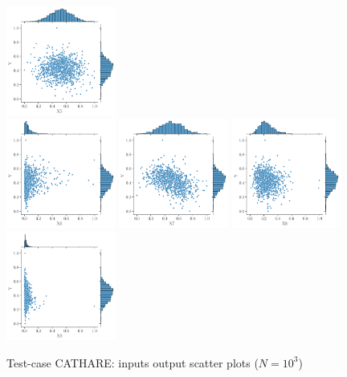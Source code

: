 \begin{figure}
    \includegraphics[width=0.32\textwidth]{./part2/figures/SIS/cathare_jointplot_X5.pdf}\\
    \includegraphics[width=0.32\textwidth]{./part2/figures/SIS/cathare_jointplot_X6.pdf}
    \includegraphics[width=0.32\textwidth]{./part2/figures/SIS/cathare_jointplot_X7.pdf}
    \includegraphics[width=0.32\textwidth]{./part2/figures/SIS/cathare_jointplot_X8.pdf}\\
    \includegraphics[width=0.32\textwidth]{./part2/figures/SIS/cathare_jointplot_X9.pdf}
    \caption{Test-case CATHARE: inputs output scatter plots ($N=10^3$) }
    \label{fig:cathare_paiplot}
\end{figure}
